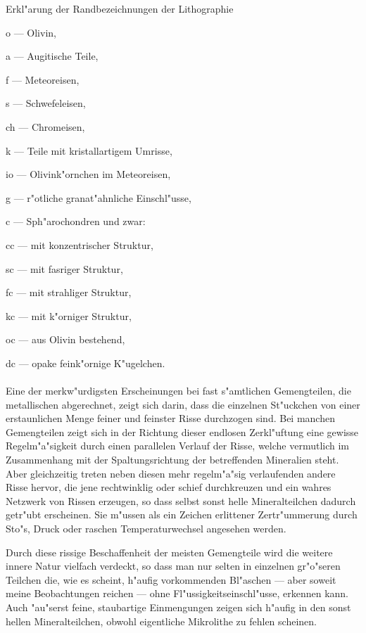 \documentclass[a4paper, 11pt, oneside]{article}
\begin{document}
Erkl"arung der Randbezeichnungen der Lithographie\\
\begin{minipage}[t]{0.54\textwidth}
o --- Olivin,

a --- Augitische Teile,

f --- Meteoreisen,

s --- Schwefeleisen,

ch --- Chromeisen,

k --- Teile mit kristallartigem Umrisse,

io --- Olivink"ornchen im Meteoreisen,

g --- r"otliche granat"ahnliche Einschl"usse,
\end{minipage}
\begin{minipage}[t]{0.46\textwidth}
c --- Sph"arochondren und zwar:

cc --- mit konzentrischer Struktur,

sc --- mit fasriger Struktur,

fc --- mit strahliger Struktur,

kc --- mit k"orniger Struktur,

oc --- aus Olivin bestehend,

dc --- opake feink"ornige K"ugelchen.
\end{minipage}
\paragraph{}
Eine der merkw"urdigsten Erscheinungen bei fast s"amtlichen Gemengteilen, die metallischen abgerechnet, zeigt sich darin, dass die einzelnen St"uckchen von einer erstaunlichen Menge feiner und feinster Risse durchzogen sind. Bei manchen Gemengteilen zeigt sich in der Richtung dieser endlosen Zerkl"uftung eine gewisse Regelm"a"sigkeit durch einen parallelen Verlauf der Risse, welche vermutlich im Zusammenhang mit der Spaltungsrichtung der betreffenden Mineralien steht. Aber gleichzeitig treten neben diesen mehr regelm"a"sig verlaufenden andere Risse hervor, die jene rechtwinklig oder schief durchkreuzen und ein wahres Netzwerk von Rissen erzeugen, so dass selbst sonst helle Mineralteilchen dadurch getr"ubt erscheinen. Sie m"ussen als ein Zeichen erlittener Zertr"ummerung durch Sto"s, Druck oder raschen Temperaturwechsel angesehen werden.

Durch diese rissige Beschaffenheit der meisten Gemengteile wird die weitere innere Natur vielfach verdeckt, so dass man nur selten in einzelnen gr"o"seren Teilchen die, wie es scheint, h"aufig vorkommenden Bl"aschen --- aber soweit meine Beobachtungen reichen --- ohne Fl"ussigkeitseinschl"usse, erkennen kann. Auch "au"serst feine, staubartige Einmengungen zeigen sich h"aufig in den sonst hellen Mineralteilchen, obwohl eigentliche Mikrolithe zu fehlen scheinen.
\end{document}

